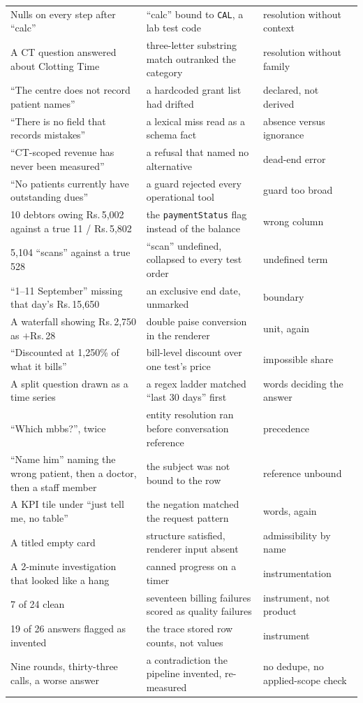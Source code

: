 \documentclass[11pt,a4paper]{report}
\newcommand{\rs}[1]{Rs.\,#1}
\newcommand{\code}[1]{\texttt{\small #1}}
\begin{document}
\begin{center}
\begin{longtable}{@{}p{5.4cm}p{5.6cm}p{3.2cm}@{}}
Nulls on every step after ``calc'' & ``calc'' bound to \code{CAL}, a lab test code & resolution
 without context\\
A CT question answered about Clotting Time & three-letter substring match outranked the category &
 resolution without family\\
``The centre does not record patient names'' & a hardcoded grant list had drifted & declared, not
 derived\\
``There is no field that records mistakes'' & a lexical miss read as a schema fact &
 absence versus ignorance\\
``CT-scoped revenue has never been measured'' & a refusal that named no alternative & dead-end
 error\\
``No patients currently have outstanding dues'' & a guard rejected every operational tool & guard
 too broad\\
10 debtors owing \rs{5{,}002} against a true 11 / \rs{5{,}802} & the \code{paymentStatus} flag
 instead of the balance & wrong column\\
5{,}104 ``scans'' against a true 528 & ``scan'' undefined, collapsed to every test order &
 undefined term\\
``1--11 September'' missing that day's \rs{15{,}650} & an exclusive end date, unmarked & boundary\\
A waterfall showing \rs{2{,}750} as $+$\rs{28} & double paise conversion in the renderer & unit,
 again\\
``Discounted at 1{,}250\% of what it bills'' & bill-level discount over one test's price &
 impossible share\\
A split question drawn as a time series & a regex ladder matched ``last 30 days'' first & words
 deciding the answer\\
``Which mbbs?'', twice & entity resolution ran before conversation reference & precedence\\
``Name him'' naming the wrong patient, then a doctor, then a staff member & the subject was not
 bound to the row & reference unbound\\
A KPI tile under ``just tell me, no table'' & the negation matched the request pattern & words,
 again\\
A titled empty card & structure satisfied, renderer input absent & admissibility by name\\
A 2-minute investigation that looked like a hang & canned progress on a timer & instrumentation\\
7 of 24 clean & seventeen billing failures scored as quality failures & instrument, not product\\
19 of 26 answers flagged as invented & the trace stored row counts, not values & instrument\\
Nine rounds, thirty-three calls, a worse answer & a contradiction the pipeline invented, re-measured
 & no dedupe, no applied-scope check\\
\bottomrule
\end{longtable}
\end{center}
\end{document}
